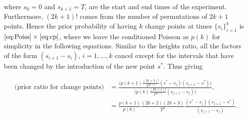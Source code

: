 \documentclass[../main.tex]{subfiles}
\begin{document}
where $s_0 = 0$ and $s_{k+1} = T$, are the start and end times of the experiment. Furthermore, $(2k+1)!$ comes from the number of permutations of $2k+1$ points. Hence the prior probability of having $k$ change points at times $\{s_i \}_{i=1}^k$ is $\eqref{eq:Poiss} \times \eqref{eq:cp}$, where we leave the conditioned Poisson as $p(k)$ for simplicity in the following equations. Similar to the heights ratio, all the factors of the form $(s_{i+1} - s_i)$, $i=1, \dots, k$ cancel except for the intervals that have been changed by the introduction of the new point $s^*$. 
Thus giving

\begin{align}
\text{(prior ratio for change points)} & = \frac{\bigg( p(k+1)\frac{(2k+3)!}{T^{2k+3}} (s^* - s_j) (s_{j+1} - s^*) \bigg) }
{ \bigg(  p(k)\frac{(2k+1)!}{T^{2k+1}} (s_{j+1} - s_j)\bigg)},  \\
& = \frac{p(k+1)}{p(k)} \frac{(2k+2)(2k+3)}{T^2} \frac{(s^* - s_j) (s_{j+1} - s^*) }{(s_{j+1} - s_j)}. \label{eq:ratioCP}
\end{align}
\end{document}
